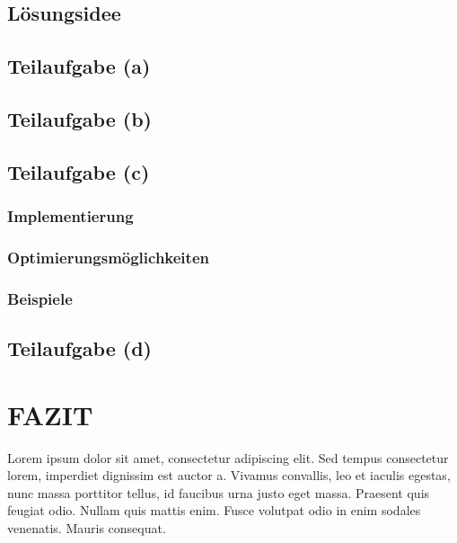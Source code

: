 \documentclass[a4paper,12pt]{article}
\begin{document}
\subsection{Lösungsidee}

\subsection{Teilaufgabe (a)}

\subsection{Teilaufgabe (b)}

\subsection{Teilaufgabe (c)}
\subsubsection{Implementierung}
\subsubsection{Optimierungsmöglichkeiten}
\subsubsection{Beispiele}

\subsection{Teilaufgabe (d)}



\newpage
\section{FAZIT}



Lorem ipsum dolor sit amet, consectetur adipiscing elit. Sed tempus consectetur lorem, imperdiet dignissim est auctor a. Vivamus convallis, leo et iaculis egestas, nunc massa porttitor tellus, id faucibus urna justo eget massa. Praesent quis feugiat odio. Nullam quis mattis enim. Fusce volutpat odio in enim sodales venenatis. Mauris consequat.
\end{document}
